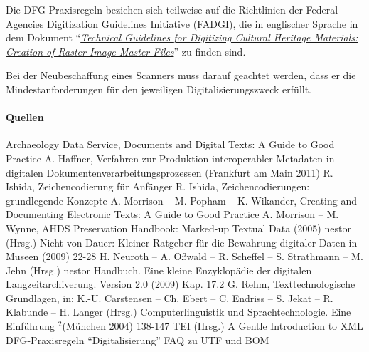 Die DFG-Praxisregeln beziehen sich teilweise auf die Richtlinien der Federal Agencies Digitization Guidelines Initiative (FADGI), die in englischer Sprache in dem Dokument "`\href{http://www.digitizationguidelines.gov/guidelines/FADGI_Still_Image-Tech_Guidelines_2010-08-24.pdf}{\emph{Technical Guidelines for Digitizing Cultural Heritage Materials: Creation of Raster Image Master Files}}"' zu finden sind.

Bei der Neubeschaffung eines Scanners muss darauf geachtet werden, dass er die Mindestanforderungen für den jeweiligen Digitalisierungszweck erfüllt.


\paragraph{Quellen}
\begin{flushleft}
Archaeology Data Service, Documents and Digital Texts: A Guide to Good Practice 
A. Haffner, Verfahren zur Produktion interoperabler Metadaten in digitalen Dokumentenverarbeitungsprozessen (Frankfurt am Main 2011) 
R. Ishida, Zeichencodierung für Anfänger 
R. Ishida, Zeichencodierungen: grundlegende Konzepte 
A. Morrison -- M. Popham -- K. Wikander, Creating and Documenting Electronic Texts: A Guide to Good Practice  %
A. Morrison -- M. Wynne, AHDS Preservation Handbook: Marked-up Textual Data (2005) 
nestor (Hrsg.) Nicht von Dauer: Kleiner Ratgeber für die Bewahrung digitaler Daten in Museen (2009) 22-28 \abstand
H. Neuroth -- A. Oßwald -- R. Scheffel -- S. Strathmann -- M. Jehn (Hrsg.) nestor Handbuch. Eine kleine Enzyklopädie der digitalen Langzeitarchiverung. Version 2.0 (2009) Kap. 17.2 \abstand
G. Rehm, Texttechnologische Grundlagen, in: K.-U. Carstensen -- Ch. Ebert -- C. Endriss -- S. Jekat -- R. Klabunde -- H. Langer (Hrsg.) Computerlinguistik und Sprachtechnologie. Eine Einführung $^2$(München 2004) 138-147 \abstand
TEI (Hrsg.) A Gentle Introduction to XML 
DFG-Praxisregeln "`Digitalisierung"' 
FAQ zu UTF und BOM 


\end{flushleft}
